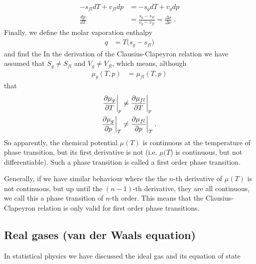 \begin{align*}
- s_{fl}  dT + v_{fl} dp &= - s_{g}  dT + v_{g} dp \\
\frac{dp}{dT} &= \frac{s_{g}-s_{fl}}{v_{g}-v_{fl}} = \frac{\Delta s}{\Delta v}\;.
\end{align*}
Finally, we define the molar vaporation enthalpy
%
\begin{align*}
q &= T\big( s_{g}-s_{fl} \big)
\end{align*}
%
and find the
In the derivation of the Clausius-Clapeyron relation we have assumed that $ S_{g}\ne S_{fl}$
and $V_{g}\ne V_{fl}$, which means, although 
%
\begin{align*}
\mu_{g}(T,p) &=\mu_{fl}(T,p) 
\end{align*}
%
that
%
\begin{align*}
\frac{\partial \mu_{g}}{\partial T}\bigg|_{p} &\ne \frac{\partial \mu_{fl}}{\partial T}\bigg|_{p}\\
\frac{\partial \mu_{g}}{\partial p}\bigg|_{T} &\ne \frac{\partial \mu_{fl}}{\partial p}\bigg|_{T}\;.
\end{align*}
%
So apparently, the chemical potential $\mu(T)$ is continuous at the temperature of phase transition, but its first derivative is not (i.e. $\mu(T$) is continuous, but not differentiable). Such a phase transition is called a first order phase transition.

Generally, if we have similar behaviour where the the $n$-th derivative of $\mu(T)$ is not continuous, but up until the $(n-1)$-th derivative, they are all continuous, we call this a phase transition of $n$-th order. This means that the Clausius-Clapeyron relation is only valid for first order phase transitions.

\subsection{Real gases (van der Waals equation)}
In statistical physics we have discussed the ideal gas and its equation of state

